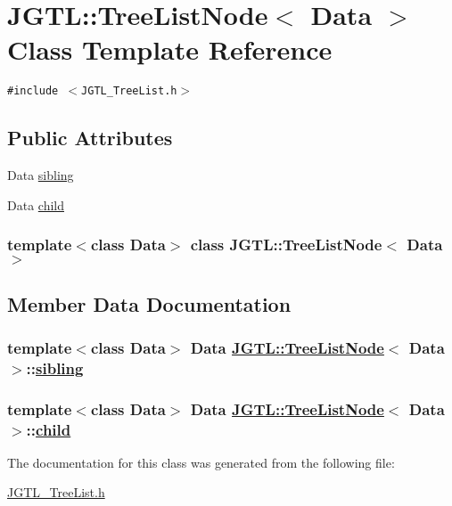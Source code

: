 \hypertarget{class_j_g_t_l_1_1_tree_list_node}{
\section{JGTL::Tree\-List\-Node$<$ Data $>$ Class Template Reference}
\label{class_j_g_t_l_1_1_tree_list_node}
}
{\tt \#include $<$JGTL\_\-Tree\-List.h$>$}

\subsection*{Public Attributes}
\begin{CompactItemize}
\item 
Data \hyperlink{class_j_g_t_l_1_1_tree_list_node_f16488a0ed66bd25c9264024aa0299de}{sibling}
\item 
Data \hyperlink{class_j_g_t_l_1_1_tree_list_node_99d8c5ad61b79d814779bf1c99448fe9}{child}
\end{CompactItemize}
\subsubsection*{template$<$class Data$>$ class JGTL::Tree\-List\-Node$<$ Data $>$}



\subsection{Member Data Documentation}
\hypertarget{class_j_g_t_l_1_1_tree_list_node_f16488a0ed66bd25c9264024aa0299de}{
\subsubsection[sibling]{\setlength{\rightskip}{0pt plus 5cm}template$<$class Data$>$ Data \hyperlink{class_j_g_t_l_1_1_tree_list_node}{JGTL::Tree\-List\-Node}$<$ Data $>$::\hyperlink{class_j_g_t_l_1_1_tree_list_node_f16488a0ed66bd25c9264024aa0299de}{sibling}}}
\label{class_j_g_t_l_1_1_tree_list_node_f16488a0ed66bd25c9264024aa0299de}


\hypertarget{class_j_g_t_l_1_1_tree_list_node_99d8c5ad61b79d814779bf1c99448fe9}{
\subsubsection[child]{\setlength{\rightskip}{0pt plus 5cm}template$<$class Data$>$ Data \hyperlink{class_j_g_t_l_1_1_tree_list_node}{JGTL::Tree\-List\-Node}$<$ Data $>$::\hyperlink{class_j_g_t_l_1_1_tree_list_node_99d8c5ad61b79d814779bf1c99448fe9}{child}}}
\label{class_j_g_t_l_1_1_tree_list_node_99d8c5ad61b79d814779bf1c99448fe9}




The documentation for this class was generated from the following file:\begin{CompactItemize}
\item 
\hyperlink{_j_g_t_l___tree_list_8h}{JGTL\_\-Tree\-List.h}\end{CompactItemize}
